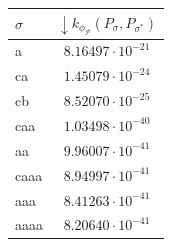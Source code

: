 \begin{table}[!t]
{\begin{tabular}{l|c}
			{$\sigma$} &
			{$\boldsymbol{\downarrow}k_{\phi_{\mathcal{P}}}(P_\sigma,P_{\sigma^*})$} \\
			
			
			\midrule
			{a}  & $8.16497\cdot10^{-21}$ \\
			{ca}  &   $1.45079\cdot10^{-24}$\\
			{cb}  &   $8.52070\cdot10^{-25}$\\
			{caa}  & $1.03498\cdot10^{-40}$\\
			{aa}  &  $9.96007\cdot10^{-41}$ \\
			{caaa}  &  $8.94997\cdot10^{-41}$ \\
			{aaa}  &  $8.41263\cdot10^{-41}$\\
			{aaaa}  & $8.20640\cdot10^{-41}$\\
			\bottomrule
	\end{tabular}}
%	
%		
%		
\end{table}

